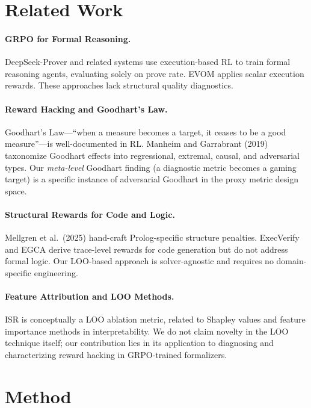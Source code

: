 \documentclass[11pt,a4paper]{article}
\newcommand{\isr}{\textsc{ISR}}
\begin{document}
\section{Related Work}
\label{sec:related}

\paragraph{GRPO for Formal Reasoning.}
DeepSeek-Prover and related systems use execution-based RL to train formal reasoning agents, evaluating solely on prove rate.
EVOM applies scalar execution rewards.
These approaches lack structural quality diagnostics.

\paragraph{Reward Hacking and Goodhart's Law.}
Goodhart's Law---``when a measure becomes a target, it ceases to be a good measure''---is well-documented in RL.
Manheim and Garrabrant (2019) taxonomize Goodhart effects into regressional, extremal, causal, and adversarial types.
Our \emph{meta-level} Goodhart finding (a diagnostic metric becomes a gaming target) is a specific instance of adversarial Goodhart in the proxy metric design space.

\paragraph{Structural Rewards for Code and Logic.}
Mellgren et al.\ (2025) hand-craft Prolog-specific structure penalties.
ExecVerify and EGCA derive trace-level rewards for code generation but do not address formal logic.
Our LOO-based approach is solver-agnostic and requires no domain-specific engineering.

\paragraph{Feature Attribution and LOO Methods.}
\isr{} is conceptually a LOO ablation metric, related to Shapley values and feature importance methods in interpretability.
We do not claim novelty in the LOO technique itself; our contribution lies in its application to diagnosing and characterizing reward hacking in GRPO-trained formalizers.


\section{Method}
\label{sec:method}
\end{document}
